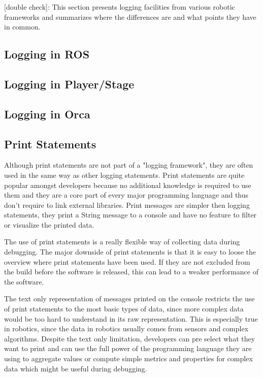 [double check]: 
This section presents logging facilities from various robotic frameworks and summarizes where the differences are and what points they have in common.


\subsection{Logging in ROS}
\label{ros_logging}

\subsection{Logging in Player/Stage}

\subsection{Logging in Orca}

\subsection{Print Statements}
Although print statements are not part of a "logging framework", they are often used in the same way as other logging statements. Print statements are quite popular amongst developers because no additional knowledge is required to use them and they are a core part of every major programming language and thus don't require to link external libraries. Print messages are simpler then logging statements, they print a String message to a console and have no feature to filter or visualize the printed data.

The use of print statements is a really flexible way of collecting data during debugging. The major downside of print statements is that it is easy to loose the overview where print statements have been used. If they are not excluded from the build before the software is released, this can lead to a weaker performance of the software.

The text only representation of messages printed on the console restricts the use of print statements to the most basic types of data, since more complex data would be too hard to understand in its raw representation. This is especially true in robotics, since the data in robotics usually comes from sensors and complex algorithms. Despite the text only limitation, developers can pre select what they want to print and can use the full power of the programming language they are using to aggregate values or compute simple metrics and properties for complex data which might be useful during debugging.

